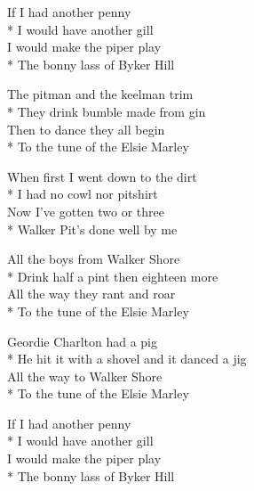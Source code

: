 

If I had another penny\\*
I would have another gill\\
I would make the piper play\\*
The bonny lass of Byker Hill


The pitman and the keelman trim\\*
They drink bumble made from gin\\
Then to dance they all begin\\*
To the tune of the Elsie Marley

When first I went down to the dirt\\*
I had no cowl nor pitshirt\\
Now I've gotten two or three\\*
Walker Pit's done well by me

All the boys from Walker Shore\\*
Drink half a pint then eighteen more\\
All the way they rant and roar\\*
To the tune of the Elsie Marley

Geordie Charlton had a pig\\*
He hit it with a shovel and it danced a jig\\
All the way to Walker Shore\\*
To the tune of the Elsie Marley

If I had another penny\\*
I would have another gill\\
I would make the piper play\\*
The bonny lass of Byker Hill

